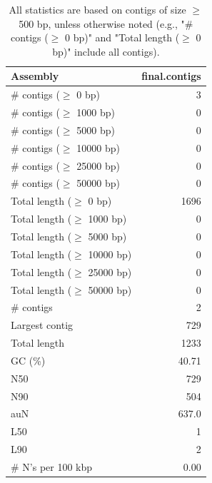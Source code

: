 \documentclass[12pt,a4paper]{article}
\begin{document}
\begin{table}[ht]
\begin{center}
\caption{All statistics are based on contigs of size $\geq$ 500 bp, unless otherwise noted (e.g., "\# contigs ($\geq$ 0 bp)" and "Total length ($\geq$ 0 bp)" include all contigs).}
\begin{tabular}{|l*{1}{|r}|}
\hline
Assembly & final.contigs \\ \hline
\# contigs ($\geq$ 0 bp) & 3 \\ \hline
\# contigs ($\geq$ 1000 bp) & 0 \\ \hline
\# contigs ($\geq$ 5000 bp) & 0 \\ \hline
\# contigs ($\geq$ 10000 bp) & 0 \\ \hline
\# contigs ($\geq$ 25000 bp) & 0 \\ \hline
\# contigs ($\geq$ 50000 bp) & 0 \\ \hline
Total length ($\geq$ 0 bp) & 1696 \\ \hline
Total length ($\geq$ 1000 bp) & 0 \\ \hline
Total length ($\geq$ 5000 bp) & 0 \\ \hline
Total length ($\geq$ 10000 bp) & 0 \\ \hline
Total length ($\geq$ 25000 bp) & 0 \\ \hline
Total length ($\geq$ 50000 bp) & 0 \\ \hline
\# contigs & 2 \\ \hline
Largest contig & 729 \\ \hline
Total length & 1233 \\ \hline
GC (\%) & 40.71 \\ \hline
N50 & 729 \\ \hline
N90 & 504 \\ \hline
auN & 637.0 \\ \hline
L50 & 1 \\ \hline
L90 & 2 \\ \hline
\# N's per 100 kbp & 0.00 \\ \hline
\end{tabular}
\end{center}
\end{table}
\end{document}
